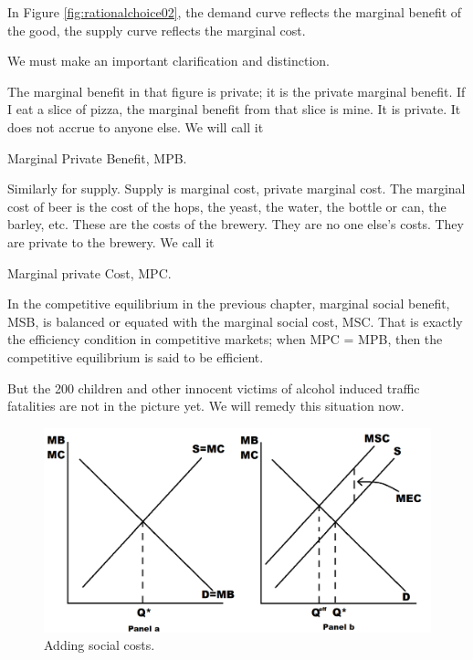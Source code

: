 \documentclass[
]{book}
\begin{document}
In Figure \ref{fig:rationalchoice02}, the demand curve reflects the marginal benefit of the good, the supply curve reflects the marginal cost.

We must make an important clarification and distinction.

The marginal benefit in that figure is private; it is the private marginal benefit. If I eat a slice of pizza, the marginal benefit from that slice is mine. It is private. It does not accrue to anyone else. We will call it

\begin{center}
Marginal Private Benefit, MPB.

\end{center}

Similarly for supply. Supply is marginal cost, private marginal cost. The marginal cost of beer is the cost of the hops, the yeast, the water, the bottle or can, the barley, etc. These are the costs of the brewery. They are no one else's costs. They are private to the brewery. We call it

\begin{center}
Marginal private Cost, MPC.

\end{center}

In the competitive equilibrium in the previous chapter, marginal social benefit, MSB, is balanced or equated with the marginal social cost, MSC. That is exactly the efficiency condition in competitive markets; when MPC = MPB, then the competitive equilibrium is said to be efficient.

But the 200 children and other innocent victims of alcohol induced traffic fatalities are not in the picture yet. We will remedy this situation now.

\begin{figure}

{\centering \includegraphics[width=0.75\linewidth]{img/externalities/extfig1} 

}

\caption{Adding social costs.}\label{fig:extfig1}
\end{figure}
\end{document}
